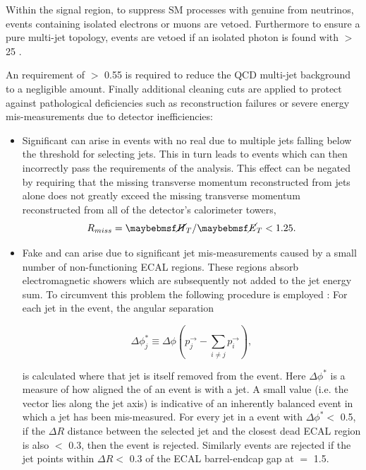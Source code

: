 Within the signal region, to suppress \ac{SM} processes with genuine \met from neutrinos, events containing isolated electrons or muons are vetoed. Furthermore to ensure a pure multi-jet topology, events are vetoed if an isolated photon is found with \pt $>$ 25 \GeV. 

An \alphat requirement of $>$ 0.55 is required to reduce the QCD multi-jet background to a negligible amount. Finally additional cleaning cuts are applied to protect against pathological deficiencies such as reconstruction failures or severe energy mis-measurements due to detector inefficiencies:

\begin{itemize}
\item Significant \mht can arise in events with no real \met due to multiple jets falling below the \pt threshold for selecting jets. This in turn leads to events which can then incorrectly pass the \alphat requirements of the analysis. This effect can be negated by requiring that the missing transverse momentum reconstructed from jets alone does not greatly exceed the missing transverse momentum reconstructed from all of the detector's calorimeter towers,
\begin{equation}
R_{miss} = \mht / \met < 1.25. \nonumber
\end{equation}  

\item Fake \met and \mht can arise due to significant jet mis-measurements caused by a small number of non-functioning \ac{ECAL} regions. These regions absorb electromagnetic showers which are subsequently not added to the jet energy sum. To circumvent this problem the following procedure is employed : For each jet in the event, the angular separation

\begin{equation}
\Delta\phi_{j}^{*}\equiv \Delta\phi(p_{j}^{\rightarrow}-\sum_{i\neq j}p_{i}^{\rightarrow}),
\end{equation}

is calculated where that jet is itself removed from the event. Here $\Delta\phi^{*}$ is a measure of how aligned the \mht of an event is with a jet. A small value (i.e. the \mht vector lies along the jet axis) is indicative of an inherently balanced event in which a jet has been mis-measured. For every jet in a event with $\Delta\phi^{*} <$ 0.5, if the $\Delta R$ distance between the selected jet and the closest dead \ac{ECAL} region is also $<$ 0.3, then the event is rejected. Similarly events are rejected if the jet points within $\Delta R <$ 0.3 of the \ac{ECAL} barrel-endcap gap at \abeta $=$ 1.5.

\end{itemize}


